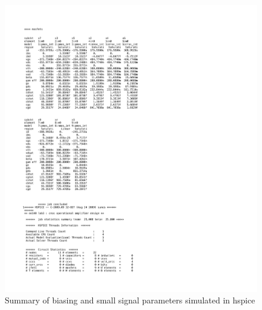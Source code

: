 \documentclass[]{article}
\begin{document}
		\begin{figure}
			\includegraphics[width=1.3\textwidth]{operating_point_page2.pdf}
			\caption{Summary of biasing and small signal parameters simulated in hspice}
		\end{figure}
		\newpage
\end{document}
